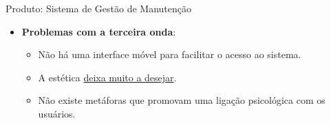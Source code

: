 \begin{frame}{Produto: Sistema de Gestão de Manutenção}
	\begin{itemize}
		\item \textbf{Problemas com a terceira onda}:
		\begin{itemize}
			\item Não há uma \alert{interface móvel} para facilitar o acesso ao sistema.
			\item A \alert{estética} \underline{deixa muito a desejar}.
			\item Não existe metáforas que promovam uma \alert{ligação psicológica} com os usuários.
			 
		\end{itemize}
	\end{itemize}

	
\end{frame}